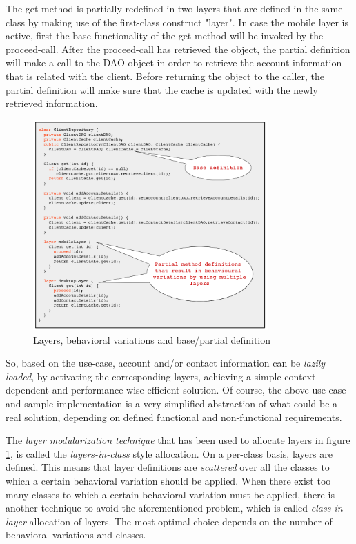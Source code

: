 \documentclass{acm_proc_article-sp}
\begin{document}
The get-method is partially redefined in two layers that are defined in the same class by making use of the first-class construct "layer". In case the mobile layer is active, first the base functionality of the get-method will be invoked by the proceed-call. After the proceed-call has retrieved the object, the partial definition will make a call to the DAO object in order to retrieve the account information that is related with the client. Before returning the object to the caller, the partial definition will make sure that the cache is updated with the newly retrieved information. 
\begin{figure}[H]
\centering
\includegraphics[width=90mm]{layers2.png}
\caption{Layers, behavioral variations and base/partial definition}
\label{fig:layers}
\end{figure}
So, based on the use-case, account and/or contact information can be \textit{lazily loaded}, by activating the corresponding layers, achieving a simple context-dependent and performance-wise efficient solution. Of course, the above use-case and sample implementation is a very simplified abstraction of what could be a real solution, depending on defined functional and non-functional requirements.

The \textit{layer modularization technique }that has been used to allocate layers in figure \ref{fig:layers}, is called the \textit{layers-in-class} style allocation. On a per-class basis, layers are defined. This means that layer definitions are \textit{scattered} over all the classes to which a certain behavioral variation should be applied. When there exist too many classes to which a certain behavioral variation must be applied, there is another technique to avoid the aforementioned problem, which is called \textit{class-in-layer} allocation of layers. The most optimal choice depends on the number of behavioral variations and classes.
\end{document}
